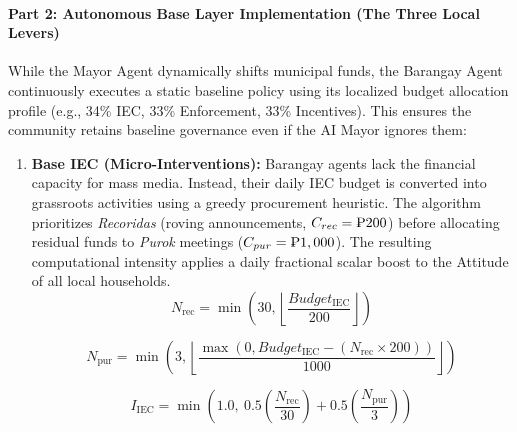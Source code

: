 \paragraph{Part 2: Autonomous Base Layer Implementation (The Three Local Levers)}
While the Mayor Agent dynamically shifts municipal funds, the Barangay Agent continuously executes a static baseline policy using its localized budget allocation profile (e.g., 34\% IEC, 33\% Enforcement, 33\% Incentives). This ensures the community retains baseline governance even if the AI Mayor ignores them:

\begin{enumerate}
    \item \textbf{Base IEC (Micro-Interventions):} Barangay agents lack the financial capacity for mass media. Instead, their daily IEC budget is converted into grassroots activities using a greedy procurement heuristic. The algorithm prioritizes \textit{Recoridas} (roving announcements, $C_{rec} = \text{\textpeso} 200$) before allocating residual funds to \textit{Purok} meetings ($C_{pur} = \text{\textpeso} 1,000$). The resulting computational intensity applies a daily fractional scalar boost to the Attitude of all local households.
    \begin{equation}
        N_{\text{rec}} = \min\left(30, \left\lfloor \frac{Budget_{\text{IEC}}}{200} \right\rfloor \right)
        \label{eq:n_rec}
    \end{equation}

    \begin{equation}
        N_{\text{pur}} = \min\left(3, \left\lfloor \frac{\max(0, Budget_{\text{IEC}} - (N_{\text{rec}} \times 200))}{1000} \right\rfloor \right)
        \label{eq:n_pur}
    \end{equation}

    \begin{equation}
        I_{\text{IEC}} = \min\left(1.0, \ 0.5\left(\frac{N_{\text{rec}}}{30}\right) + 0.5\left(\frac{N_{\text{pur}}}{3}\right)\right)
        \label{eq:i_iec}
    \end{equation}


\end{enumerate}
